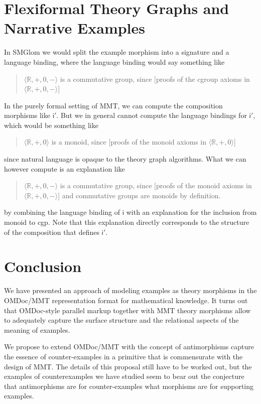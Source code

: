\documentclass[11pt]{bluenote}
\def\mmt{MMT\xspace}
\def\omdoc{OMDoc\xspace}
\def\omdoc{OMDoc\xspace}
\begin{document}
\section{Flexiformal Theory Graphs and Narrative Examples}

In SMGlom we would split the example morphism into a signature and a language binding,
where the language binding would say something like 
\begin{quote}
  $\langle\mathbb{R},+,0,-\rangle$ is a commutative group, since [proofs of the cgroup
  axioms in $\langle\mathbb{R},+,0,-\rangle$]
\end{quote}
In the purely formal setting of MMT, we can compute the composition morphisms like
$\mathsf{i}'$. But we in general cannot compute the language bindings for $\mathsf{i}'$,
which would be something like 
\begin{quote}
  $\langle\mathbb{R},+,0\rangle$ is a monoid, since [proofs of the monoid axioms in $\langle\mathbb{R},+,0\rangle$]
\end{quote}
since natural language is opaque to the theory graph algorithms. What we can however
compute is an explanation like 
\begin{quote}
  $\langle\mathbb{R},+,0,-\rangle$ is a commutative group, since [proofs of the monoid
  axioms in $\langle\mathbb{R},+,0,-\rangle$] and commutative groups are monoids by
  definition.
\end{quote}
by combining the language binding of $\mathsf{i}$ with an explanation for the inclusion
from \textsf{monoid} to \textsf{cgp}. Note that this explanation directly corresponds to
the structure of the composition that defines $\mathsf{i}'$.

\section{Conclusion}

We have presented an approach of modeling examples as theory morphisms in the \omdoc/\mmt
representation format for mathematical knowledge.  It turns out that \omdoc-style parallel
markup together with \mmt theory morphisms allow to adequately capture the surface
structure and the relational aspects of the meaning of examples.

We propose to extend \omdoc/\mmt with the concept of antimorphisms capture the essence of
counter-examples in a primitive that is commensurate with the design of \mmt. The details
of this proposal still have to be worked out, but the examples of counterexamples we have
studied seem to bear out the conjecture that antimorphisms are for counter-examples what
morphisms are for supporting examples. 
\end{document}
